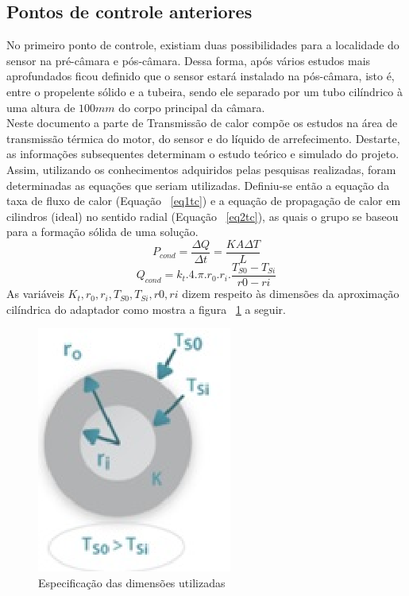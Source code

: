 \subsection{Pontos de controle anteriores}
No primeiro ponto de controle, existiam duas possibilidades para a localidade do sensor na pré-câmara e pós-câmara. Dessa forma, após vários estudos mais aprofundados ficou definido que o sensor estará instalado na pós-câmara, isto é, entre o propelente sólido e a tubeira, sendo ele separado por um tubo cilíndrico à uma altura de $100mm$ do corpo principal da câmara.\\
Neste documento a parte de Transmissão de calor compõe os estudos na área de transmissão térmica do motor, do sensor e do líquido de arrefecimento. Destarte, as informações subsequentes determinam o estudo teórico e simulado do projeto.\\
Assim, utilizando os conhecimentos adquiridos pelas pesquisas realizadas, foram determinadas as equações que seriam utilizadas. Definiu-se então a equação da taxa de fluxo de calor (Equação ~\ref{eq1tc}) e a equação de propagação de calor em cilindros (ideal) no sentido radial (Equação ~\ref{eq2tc}), as quais o grupo se baseou para a formação sólida de uma solução.
\begin{equation}\label{eq1tc}
P_{cond}=\frac{\Delta Q}{\Delta t}=\frac{KA\Delta T}{L}
\end{equation}
\begin{equation}\label{eq2tc}
Q_{cond}=k_t.4.\pi.r_0.r_i.\frac{T_{S0}-T_{Si}}{r0-ri}
\end{equation}
As variáveis $K_t,r_0,r_i,T_{S0},T_{Si},r0,ri$ dizem respeito às dimensões da aproximação cilíndrica do adaptador como mostra a figura ~\ref{fig3tc} a seguir.
\begin{figure}[!htb]                  
	\centering                          
	\includegraphics[scale=1]{figuras/Figura3tc.eps}
	\caption{Especificação das dimensões utilizadas}\label{fig3tc}               
\end{figure}
